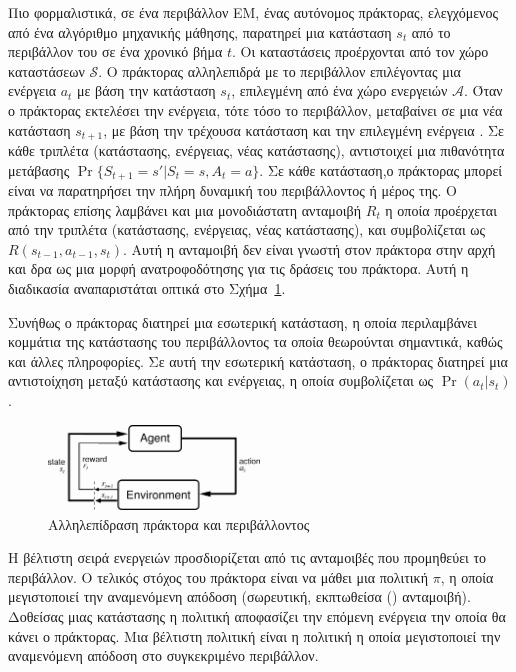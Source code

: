 Πιο φορμαλιστικά, σε ένα περιβάλλον ΕΜ, ένας αυτόνομος πράκτορας, ελεγχόμενος από ένα αλγόριθμο μηχανικής μάθησης,
παρατηρεί μια κατάσταση $s_t$ από το περιβάλλον του σε ένα χρονικό βήμα $t$. Οι καταστάσεις προέρχονται από τον
χώρο καταστάσεων $\mathcal{S}$. Ο πράκτορας αλληλεπιδρά με το περιβάλλον επιλέγοντας μια ενέργεια $a_t$ με βάση την κατάσταση
$s_t$, επιλεγμένη από ένα χώρο ενεργειών $\mathcal{A}$. Όταν ο πράκτορας εκτελέσει την ενέργεια, τότε τόσο το περιβάλλον,
μεταβαίνει σε μια νέα κατάσταση $s_{t+1}$, με βάση την τρέχουσα κατάσταση και την επιλεγμένη
ενέργεια \cite{drlbs}. Σε κάθε τριπλέτα (κατάστασης, ενέργειας, νέας κατάστασης), αντιστοιχεί μια πιθανότητα μετάβασης
$\Pr{\{S_{t+1}=s'|S_t=s, A_{t}=a\}}$. Σε κάθε κατάσταση,ο πράκτορας μπορεί είναι να παρατηρήσει την πλήρη δυναμική του
περιβάλλοντος ή μέρος της. Ο πράκτορας επίσης λαμβάνει και μια μονοδιάστατη ανταμοιβή $R_t$
η οποία προέρχεται από την τριπλέτα (κατάστασης, ενέργειας, νέας κατάστασης), και συμβολίζεται ως
$R(s_{t-1}, a_{t-1}, s_t)$. Αυτή η ανταμοιβή δεν είναι γνωστή στον πράκτορα στην αρχή και
δρα ως μια μορφή ανατροφοδότησης για τις δράσεις του πράκτορα.
Αυτή η διαδικασία αναπαριστάται οπτικά στο Σχήμα~\ref{fig:agent_environment}.


Συνήθως ο πράκτορας διατηρεί μια εσωτερική κατάσταση, η οποία περιλαμβάνει κομμάτια της κατάστασης του περιβάλλοντος τα οποία θεωρούνται
σημαντικά, καθώς και άλλες πληροφορίες. Σε αυτή την εσωτερική κατάσταση, ο πράκτορας
διατηρεί μια αντιστοίχηση μεταξύ κατάστασης και ενέργειας, η οποία συμβολίζεται ως $\Pr(a_t | s_t)$.

\begin{figure}[h]
    \includegraphics[width=0.5\textwidth]{body_matter/chapter1/images/agent_environment.png}
    \Centering
    \caption{Αλληλεπίδραση πράκτορα και περιβάλλοντος}
    \label{fig:agent_environment}
\end{figure}


Η βέλτιστη σειρά ενεργειών προσδιορίζεται από τις ανταμοιβές που προμηθεύει το περιβάλλον. Ο τελικός στόχος του πράκτορα είναι να μάθει μια
πολιτική $π$, η οποία μεγιστοποιεί την αναμενόμενη απόδοση (σωρευτική, εκπτωθείσα () ανταμοιβή). Δοθείσας μιας κατάστασης
η πολιτική αποφασίζει την επόμενη ενέργεια την οποία θα κάνει ο πράκτορας. Μια βέλτιστη πολιτική είναι η πολιτική η οποία μεγιστοποιεί
την αναμενόμενη απόδοση στο συγκεκριμένο περιβάλλον.

